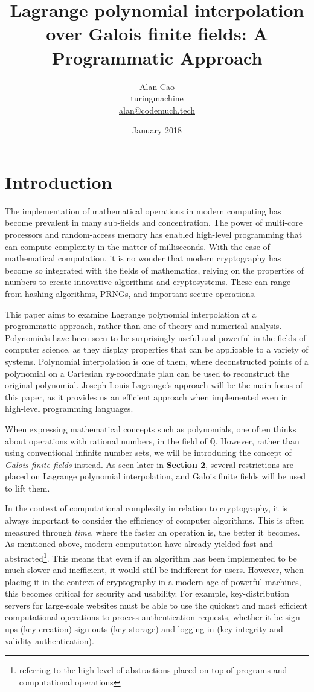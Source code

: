 \documentclass{article}
\title{Lagrange polynomial interpolation over Galois finite fields: A Programmatic Approach}
\author{Alan Cao \\ turingmachine \\
\href{mailto:alan@codemuch.tech}{alan@codemuch.tech}}
\date{January 2018}
\begin{document}
\maketitle

\section{Introduction}

The implementation of mathematical operations in modern computing has become prevalent in many sub-fields and concentration. The power of multi-core processors and random-access memory has enabled high-level programming that can compute complexity in the matter of milliseconds. With the ease of mathematical computation, it is no wonder that modern cryptography has become so integrated with the fields of mathematics, relying on the properties of numbers to create innovative algorithms and cryptosystems. These can range from hashing algorithms, PRNGs, and important secure operations.

This paper aims to examine Lagrange polynomial interpolation at a programmatic approach, rather than one of theory and numerical analysis. Polynomials have been seen to be surprisingly useful and powerful in the fields of computer science, as they display properties that can be applicable to a variety of systems. Polynomial interpolation is one of them, where deconstructed points of a polynomial on a Cartesian \textit{xy}-coordinate plan can be used to reconstruct the original polynomial. 
Joseph-Louis Lagrange's approach will be the main focus of this paper, as it provides us an efficient approach when implemented even in high-level programming languages.

When expressing mathematical concepts such as polynomials, one often thinks about operations with rational numbers, in the field of $\mathbb{Q}$. However, rather than using conventional infinite number sets, we will be introducing the concept of \textit{Galois finite fields} instead. As seen later in \textbf{Section 2}, several restrictions are placed on Lagrange polynomial interpolation, and Galois finite fields will be used to lift them.

In the context of computational complexity in relation to cryptography, it is always important to consider the efficiency of computer algorithms. This is often measured through \textit{time}, where the faster an operation is, the better it becomes. As mentioned above, modern computation have already yielded fast and abstracted\footnote{referring to the high-level of abstractions placed on top of programs and computational operations}. This means that even if an algorithm has been implemented to be much slower and inefficient, it would still be indifferent for users. However, when placing it in the context of cryptography in a modern age of powerful machines, this becomes critical for security and usability. For example, key-distribution servers for large-scale websites must be able to use the quickest and most efficient computational operations to process authentication requests, whether it be sign-ups (key creation) sign-outs (key storage) and logging in (key integrity and validity authentication).
\end{document}
